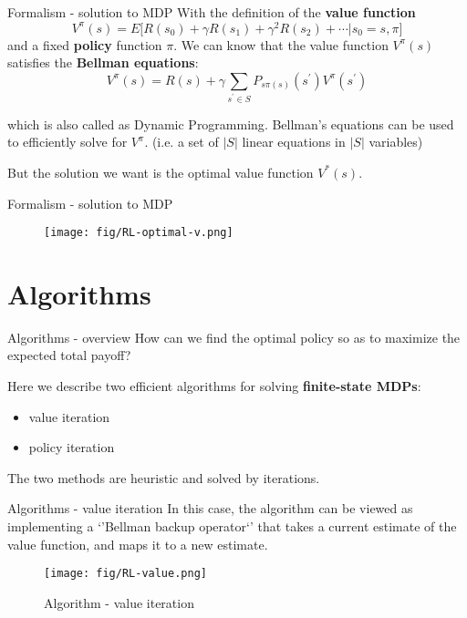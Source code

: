 \documentclass[10pt]{beamer}
\begin{document}
\begin{frame}{Formalism - solution to MDP}
  With the definition of the \textbf{value function} $$V^{\pi}(s)=E\bigl[R(s_0) + \gamma R(s_1) + \gamma^2 R(s_2) + \cdots|s_0=s, \pi\bigr]$$ and a fixed \textbf{policy} function $\pi$. We can know that the value function $V^{\pi}(s)$ satisfies the \textbf{Bellman equations}: $$V^{\pi}(s)=R(s) + \gamma\sum_{s^{'}\in S}P_{s\pi(s)}(s^{'})V^{\pi}(s^{'})$$

  which is also called as \alert{Dynamic Programming}. Bellman's equations can be used to efficiently solve for $V^{\pi}$. (i.e. a set of $|S|$ linear equations in $|S|$ variables)

  But the solution we want is the optimal value function $V^{*}(s)$.
\end{frame}

\begin{frame}{Formalism - solution to MDP}
  \begin{figure}[htbp]
    \centering
    \texttt{[image: fig/RL-optimal-v.png]}
  \end{figure}
\end{frame}

\section{Algorithms}

\begin{frame}[fragile]{Algorithms - overview}
  How can we find the optimal policy so as to maximize the expected total payoff?

  Here we describe two efficient algorithms for solving \textbf{finite-state MDPs}:
  \begin{itemize}
    \item value iteration
    \item policy iteration
  \end{itemize}
  
  The two methods are heuristic and solved by iterations.
\end{frame}

\begin{frame}[fragile]{Algorithms - value iteration}
  In this case, the algorithm can be viewed as implementing a `'Bellman backup operator`' that takes a current estimate of the value function, and maps it to a new estimate.

  \begin{figure}[htbp]
    \centering
    \texttt{[image: fig/RL-value.png]}
    \caption{Algorithm - value iteration}
  \end{figure}
\end{frame}
\end{document}
